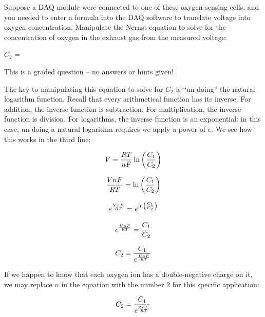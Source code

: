 \vskip 10pt

Suppose a DAQ module were connected to one of these oxygen-sensing cells, and you needed to enter a formula into the DAQ software to translate voltage into oxygen concentration.  Manipulate the Nernst equation to solve for the concentration of oxygen in the exhaust gas from the measured voltage:

\vskip 30pt

$C_2$ = 

\vfil 

\eject






This is a graded question -- no answers or hints given!







The key to manipulating this equation to solve for $C_2$ is ``un-doing'' the natural logarithm function.  Recall that every arithmetical function has its inverse.  For addition, the inverse function is subtraction.  For multiplication, the inverse function is division.  For logarithms, the inverse function is an exponential: in this case, un-doing a natural logarithm requires we apply a power of $e$.  We see how this works in the third line:

$$V = {{R T} \over {nF}} \ln \left({C_1 \over C_2}\right)$$

$${VnF \over RT} =  \ln \left({C_1 \over C_2}\right)$$

$$e^{VnF \over RT} =  e^{\ln \left({C_1 \over C_2}\right)}$$

$$e^{VnF \over RT} =  {C_1 \over C_2}$$

$$C_2 = {C_1 \over e^{VnF \over RT}}$$

If we happen to know that each oxygen ion has a double-negative charge on it, we may replace $n$ in the equation with the number 2 for this specific application:

$$C_2 = {C_1 \over e^{2VF \over RT}}$$



